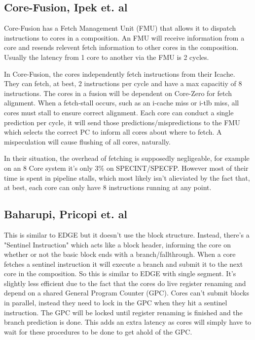 \subsection{Core-Fusion, Ipek et. al}

Core-Fusion has a Fetch Management Unit (FMU) that allows it to dispatch instructions to cores in a composition.
An FMU will receive information from a core and resends relevent fetch information to other cores in the composition.
Usually the latency from 1 core to another via the FMU is 2 cycles.

In Core-Fusion, the cores independently fetch instructions from their Icache. They can fetch, at best, 2 instructions per cycle and have a max capacitiy of 8 instructions.
The cores in a fusion will be dependent on Core-Zero for fetch alignment.
When a fetch-stall occurs, such as an i-cache miss or i-tlb miss, all cores must stall to ensure correct alignment.
Each core can conduct a single prediction per cycle, it will send those predictions/mispredictions to the FMU which selects the correct PC to inform all cores about where to fetch.
A mispeculation will cause flushing of all cores, naturally.

In their situation, the overhead of fetching is supposedly negligeable, for example on an 8 Core system it's only 3\% on SPECINT/SPECFP.
However most of their time is spent in pipeline stalls, which most likely isn't alieviated by the fact that, at best, each core can only have 8 instructions running at any point.

\subsection{Baharupi, Pricopi et. al}
This is similar to EDGE but it doesn't use the block structure.
Instead, there's a "Sentinel Instruction" which acts like a block header, informing the core on whether or not the basic block ends with a branch/fallthrough.
When a core fetches a sentinel instruction it will execute a branch and submit it to the next core in the composition.
So this is similar to EDGE with single segment.
It's slightly less efficient due to the fact that the cores do live register renaming and depend on a shared General Program Counter (GPC).
Cores can't submit blocks in parallel, instead they need to lock in the GPC when they hit a sentinel instruction.
The GPC will be locked until register renaming is finished and the branch prediction is done.
This adds an extra latency as cores will simply have to wait for these procedures to be done to get ahold of the GPC.

